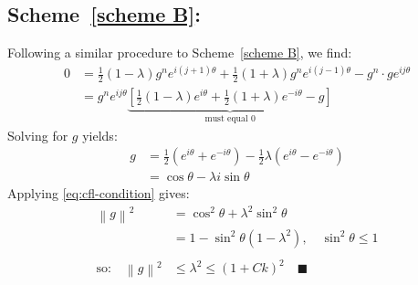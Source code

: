 \documentclass{math_hw}
\renewcommand\qedsymbol{\blacksquare}
\theoremstyle{definition}
\begin{document}
    \subsection*{Scheme~\ref{scheme B}:}
    Following a similar procedure to Scheme~\ref{scheme B}, we find:
    \begin{equation*}
        \begin{split}
            0 &= \frac{1}{2}(1-\lambda)g^{n}e^{i(j+1)\theta}+\frac{1}{2} (1+\lambda)g^{n}e^{i(j-1)\theta}-g^n\cdot g e^{ij\theta} \\
            &=g^n e^{ij\theta}\underbrace{\left[ \frac{1}{2}(1-\lambda)e^{i\theta}+\frac{1}{2}(1+\lambda)e^{-i\theta} -g \right]}_{\text{must equal 0}}
        \end{split}
    \end{equation*}
    Solving for $g$ yields:
    \begin{equation*}
        \begin{split}
            g&=\frac{1}{2}\left( e^{i\theta}+e^{-i\theta} \right)-\frac{1}{2}\lambda\left( e^{i\theta}-e^{-i\theta} \right)\\
            &=\cos \theta -\lambda i\sin \theta
        \end{split}
    \end{equation*}
    Applying \cref{eq:cfl-condition} gives:
    \begin{equation*}
        \begin{split}
            \left\| g \right\|^2 &= \cos^2\theta +\lambda ^2\sin ^2 \theta \\
            &=1-\sin ^2 \theta \left( 1-\lambda ^2 \right),\quad \sin^2 \theta \leq 1 \\ \\
            \text{so:}\quad \left\| g \right\|^2 &\leq \lambda^2 \leq \left( 1+Ck \right)^2 \quad \qedsymbol
        \end{split}
    \end{equation*}
\end{document}
